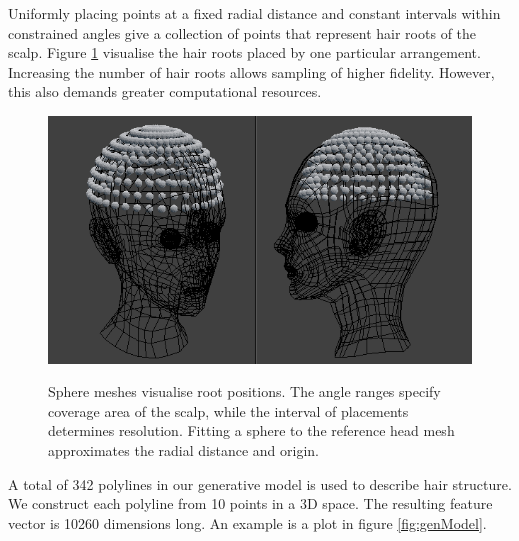 \documentclass[ %
author={Dillon Keith Diep},
supervisor={Dr. Carl Henrik Ek},
degree={MEng},
title={ART-CG Hair:},
subtitle={Assisted Real-time Content Generation of Stylised Virtual Hair},
type={Research},
year={2017} ]{dissertation}
\begin{document}
Uniformly placing points at a fixed radial distance and constant intervals within constrained angles give a collection of points that represent hair roots of the scalp. Figure \ref{fig:roots} visualise the hair roots placed by one particular arrangement. Increasing the number of hair roots allows sampling of higher fidelity. However, this also demands greater computational resources.

\begin{figure}[!h]
	\centering
	\caption{Sphere meshes visualise root positions. The angle ranges specify coverage area of the scalp, while the interval of placements determines resolution. Fitting a sphere to the reference head mesh approximates the radial distance and origin.}
	\includegraphics[scale=0.5]{images/spherePoints}\\
	\label{fig:roots}
\end{figure}

A total of 342 polylines in our generative model is used to describe hair structure. We construct each polyline from 10 points in a 3D space. The resulting feature vector is 10260 dimensions long. An example is a plot in figure \ref{fig:genModel}.
\end{document}
